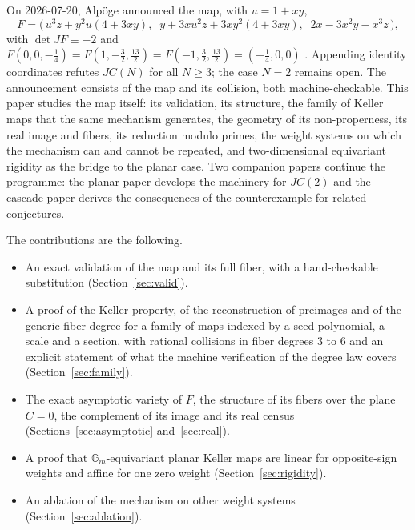 \documentclass[11pt]{article}
\theoremstyle{definition}
\theoremstyle{remark}
\newcommand{\Gm}{\mathbb{G}_m}
\newcommand{\detJ}{\det JF}
\begin{document}
On 2026-07-20, Alp\"oge announced the map, with $u = 1 + xy$,
\begin{equation}\label{eq:F}
F = \bigl(\,u^3 z + y^2 u (4 + 3xy),\;\; y + 3x u^2 z + 3x y^2 (4 + 3xy),\;\; 2x - 3x^2 y - x^3 z\,\bigr),
\end{equation}
with $\detJ \equiv -2$ and
$F(0, 0, -\tfrac14) = F(1, -\tfrac32, \tfrac{13}{2}) = F(-1, \tfrac32, \tfrac{13}{2}) =
(-\tfrac14, 0, 0)$ \cite{Alpoge2026}. Appending identity coordinates refutes $JC(N)$ for all
$N \ge 3$; the case $N = 2$ remains open. The announcement consists of the map and its
collision, both machine-checkable. This paper studies the map itself: its validation, its
structure, the family of Keller maps that the same mechanism generates, the geometry of its
non-properness, its real image and fibers, its reduction modulo primes, the weight systems on which
the mechanism can and cannot be repeated, and two-dimensional equivariant rigidity as the bridge to
the planar case. Two companion papers continue the programme: the planar paper \cite{SLplanar}
develops the machinery for $JC(2)$ and the cascade paper \cite{SLcascade} derives the consequences
of the counterexample for related conjectures.

The contributions are the following.
\begin{itemize}
\item An exact validation of the map and its full fiber, with a hand-checkable substitution (Section~\ref{sec:valid}).
\item A proof of the Keller property, of the reconstruction of preimages and of the generic fiber degree for a
family of maps indexed by a seed polynomial, a scale and a section, with rational collisions in fiber degrees $3$ to $6$ and an
explicit statement of what the machine verification of the degree law covers (Section~\ref{sec:family}).
\item The exact asymptotic variety of $F$, the structure of its fibers over the plane $C = 0$, the complement of its image and its
real census (Sections~\ref{sec:asymptotic} and~\ref{sec:real}).
\item A proof that $\Gm$-equivariant planar Keller maps are linear for opposite-sign weights and affine for one zero weight
(Section~\ref{sec:rigidity}).
\item An ablation of the mechanism on other weight systems (Section~\ref{sec:ablation}).
\end{itemize}
\end{document}
